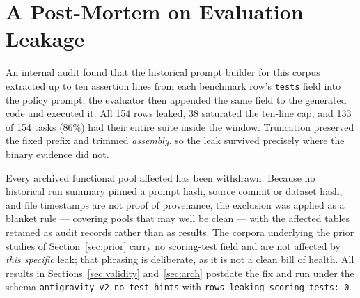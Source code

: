 \documentclass[conference]{IEEEtran}
\begin{document}
\section{A Post-Mortem on Evaluation Leakage}
\label{sec:leak}
An internal audit found that the historical prompt builder for this corpus
extracted up to ten
assertion lines from each benchmark row's \texttt{tests} field into the policy
prompt; the evaluator then appended the same field to the generated code and
executed it. All 154 rows leaked, 38 saturated the ten-line cap, and 133 of 154
tasks (86\%) had their entire suite inside the window. Truncation preserved the
fixed prefix and trimmed \emph{assembly}, so the leak survived precisely where
the binary evidence did not.

Every archived functional pool affected has been withdrawn. Because no historical
run summary pinned a prompt hash, source commit or dataset hash, and file
timestamps are not proof of provenance, the exclusion was applied as a blanket
rule --- covering pools that may well be clean --- with the affected tables
retained as audit records rather than as results. The corpora underlying the
prior studies of Section~\ref{sec:prior} carry no scoring-test field and are not
affected by \emph{this specific} leak; that phrasing is deliberate, as it is not
a clean bill of health. All results in
Sections~\ref{sec:validity} and~\ref{sec:arch} postdate the fix and run under
the schema \texttt{antigravity-v2-no-test-hints} with
\texttt{rows\_leaking\_scoring\_tests: 0}.
\end{document}
